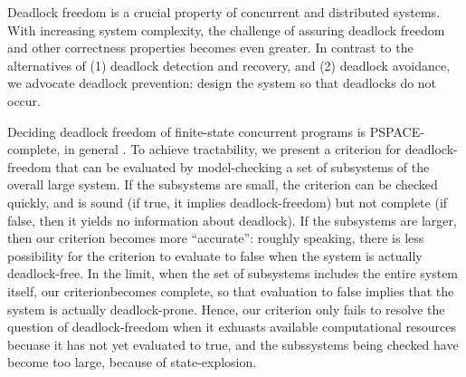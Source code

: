 



Deadlock freedom is a crucial property of concurrent and distributed systems. With increasing system
complexity, the challenge of assuring deadlock freedom and other correctness properties becomes even
greater.  In contrast to the alternatives of (1) deadlock detection and recovery, and (2) deadlock
avoidance, we advocate deadlock prevention: design the system so that deadlocks do not occur.

Deciding deadlock freedom of finite-state concurrent programs is PSPACE-complete, in general
\cite[chapter 19]{papadimitriou1994computational}. To achieve tractability, we present a criterion
for deadlock-freedom that can be evaluated by model-checking a set of subsystems of the overall
large system. If the subsystems are small, the criterion can be checked quickly, and is sound (if
true, it implies deadlock-freedom) but not complete (if false, then it yields no information about
deadlock). If the subsystems are larger, then our criterion becomes more ``accurate'': roughly
speaking, there is less possibility for the criterion to evaluate to false when the system is
actually deadlock-free. In the limit, when the set of subsystems includes the entire system itself,
our criterionbecomes complete, so that evaluation to false implies that the system is actually
deadlock-prone. Hence, our criterion only fails to resolve the question of deadlock-freedom 
when it exhuasts available computational resources becuase it has not yet evaluated to true, and the
subssystems being checked have become too large, because of state-explosion.

